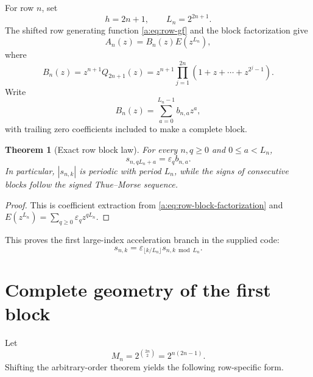 \documentclass[11pt,a4paper,oneside,openany]{book}
\numberwithin{equation}{chapter}
\newtheorem{theorem}{Theorem}[chapter]
\theoremstyle{definition}
\theoremstyle{remark}
\newcommand{\eps}{\varepsilon}
\begin{document}
For row \(n\), set
\begin{equation}
 h=2n+1,
 \qquad
 L_n=2^{2n+1}.
 \label{a:eq:row-h-L}
\end{equation}
The shifted row generating function \eqref{a:eq:row-gf} and the block
factorization give
\begin{equation}
 A_n(z)=B_n(z)E(z^{L_n}),
 \label{a:eq:row-block-factorization}
\end{equation}
where
\begin{equation}
 \boxed{
 B_n(z)=z^{n+1}Q_{2n+1}(z)
 =z^{n+1}\prod_{j=1}^{2n}
 (1+z+\cdots+z^{2^j-1}).}
 \label{a:eq:Bn-definition}
\end{equation}
Write
\begin{equation}
 B_n(z)=\sum_{a=0}^{L_n-1}b_{n,a}z^a,
 \label{a:eq:bna-definition}
\end{equation}
with trailing zero coefficients included to make a complete block.

\begin{theorem}[Exact row block law]
For every \(n,q\ge0\) and \(0\le a<L_n\),
\begin{equation}
 \boxed{s_{n,qL_n+a}=\eps_q b_{n,a}.}
 \label{a:eq:row-signed-block}
\end{equation}
In particular, \(|s_{n,k}|\) is periodic with period \(L_n\), while the signs
of consecutive blocks follow the signed Thue--Morse sequence.
\end{theorem}

\begin{proof}
This is coefficient extraction from
\eqref{a:eq:row-block-factorization} and
\(E(z^{L_n})=\sum_{q\ge0}\eps_qz^{qL_n}\).
\end{proof}

This proves the first large-index acceleration branch in the supplied code:
\[
 s_{n,k}=\eps_{\lfloor k/L_n\rfloor}
 s_{n,k\bmod L_n}.
\]

\section{Complete geometry of the first block}

Let
\begin{equation}
 M_n=2^{\binom{2n}{2}}=2^{n(2n-1)}.
 \label{a:eq:Mn-definition}
\end{equation}
Shifting the arbitrary-order theorem yields the following row-specific form.
\end{document}
